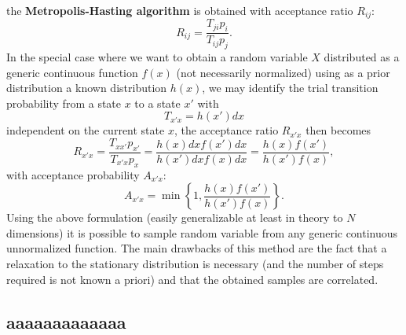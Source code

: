 the \textbf{Metropolis-Hasting algorithm} is obtained with acceptance ratio $R_{ij}$:
\begin{equation}
    R_{ij}=\frac{T_{ji}p_i}{T_{ij}p_j}.
\end{equation}
In the special case where we want to obtain a random variable $X$ distributed as a generic continuous function $f(x)$ (not necessarily 
normalized) using as a prior distribution a known distribution $h(x)$, we may identify the trial transition probability from a state $x$ to 
a state $x'$ with
\begin{equation}
    T_{x'x}=h(x')dx
\end{equation}
independent on the current state $x$, the acceptance ratio $R_{x'x}$ then becomes
\begin{equation}
    R_{x'x}=\frac{T_{xx'}p_{x'}}{T_{x'x}p_{x}}=\frac{h(x)dxf(x')dx}{h(x')dxf(x)dx}=\frac{h(x)f(x')}{h(x')f(x)},
\end{equation}
with acceptance probability $A_{x'x}$:
\begin{equation}
    A_{x'x}=\min{\left\{1,\frac{h(x)f(x')}{h(x')f(x)}\right\}}.
    \label{acceptance_prob_distrib}
\end{equation}
Using the above formulation (easily generalizable at least in theory to $N$ dimensions) it is possible to sample random variable from any generic continuous 
unnormalized function. The main drawbacks of this method are the fact that a relaxation to the stationary distribution is necessary (and the number of steps required is 
not known a priori) and that the obtained samples are correlated.
\subsection{aaaaaaaaaaaaa}
